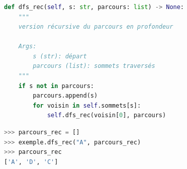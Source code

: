 \documentclass[svgnames,11pt]{beamer}
\begin{document}
\begin{frame}[fragile]
    \frametitle{}

\begin{center}
\begin{lstlisting}[language=Python , basicstyle=\ttfamily\small, xleftmargin=0.2em, xrightmargin=0em]
def dfs_rec(self, s: str, parcours: list) -> None:
    """
    version récursive du parcours en profondeur

    Args:
        s (str): départ
        parcours (list): sommets traversés
    """
    if s not in parcours:
        parcours.append(s)
        for voisin in self.sommets[s]:
            self.dfs_rec(voisin[0], parcours)
\end{lstlisting}
\begin{lstlisting}[language=Python , basicstyle=\ttfamily\small, xleftmargin=0.2em, xrightmargin=0em]
>>> parcours_rec = []
>>> exemple.dfs_rec("A", parcours_rec)
>>> parcours_rec
['A', 'D', 'C'] 
\end{lstlisting}
\end{center} 

\end{frame}
\end{document}
